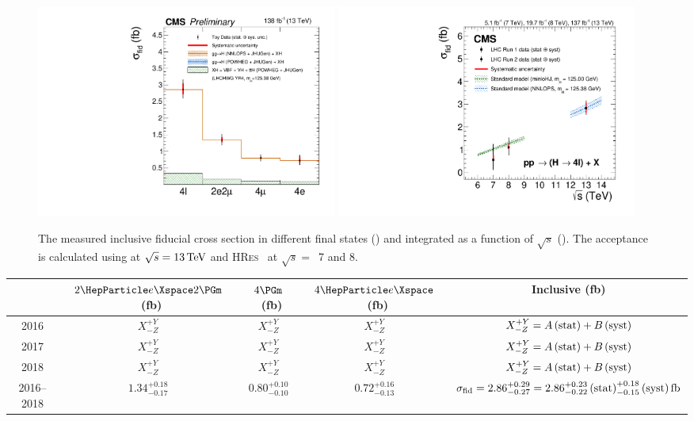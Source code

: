 \begin{figure}[!htb]
	\centering
	\includegraphics[width=0.48\textwidth]{Images/H4L/mass4l_unfoldwith_SM_125_asimov.pdf}
	\includegraphics[width=0.48\textwidth]{Images/H4L/Figure_016-b.pdf}
	\caption{
		The measured inclusive fiducial cross section in different final states (\cmsLeft) and integrated as a function of $\sqrt{s}$ (\cmsRight).
		The acceptance is calculated using \POWHEG at  $\sqrt{s}=13\,\text{Te\hspace{-.08em}V}$ and \textsc{HRes}~\cite{Grazzini:2013mca,deFlorian:2012mx}
		at $\sqrt{s}=$~7 and 8\TeV.
		\label{fig:fiducial_inclusive}}
\end{figure}

\begin{table}[!htb]
	\centering
	\renewcommand{\arraystretch}{1.5}
	\begin{tabular}{ccccc}
		& $2\Pe 2\Pgm$~(fb) & $4\Pgm$~(fb) & $4\Pe$~(fb) & Inclusive (fb) \\
		\hline
		2016 & $X^{+Y}_{-Z}$ & $X^{+Y}_{-Z}$ & $X^{+Y}_{-Z}$ & $X^{+Y}_{-Z} = A\,\text{(stat)}+B\,\text{(syst)}$  \\
		2017 & $X^{+Y}_{-Z}$ & $X^{+Y}_{-Z}$ & $X^{+Y}_{-Z}$ & $X^{+Y}_{-Z} = A\,\text{(stat)}+B\,\text{(syst)}$   \\
		2018 & $X^{+Y}_{-Z}$ & $X^{+Y}_{-Z}$ & $X^{+Y}_{-Z}$ & $X^{+Y}_{-Z} = A\,\text{(stat)}+B\,\text{(syst)}$   \\
		2016--2018 & $1.34^{+0.18}_{-0.17}$ & $0.80^{+0.10}_{-0.10}$ & $0.72^{+0.16}_{-0.13}$ & $\sigma_{{\mathrm{fid}}}=2.86^{+0.29}_{-0.27}=2.86^{+0.23}_{-0.22}\,\text{(stat)}^{+0.18}_{-0.15}\,\text{(syst)} \text{\,fb}$   \\
	\end{tabular}
\end{table}

